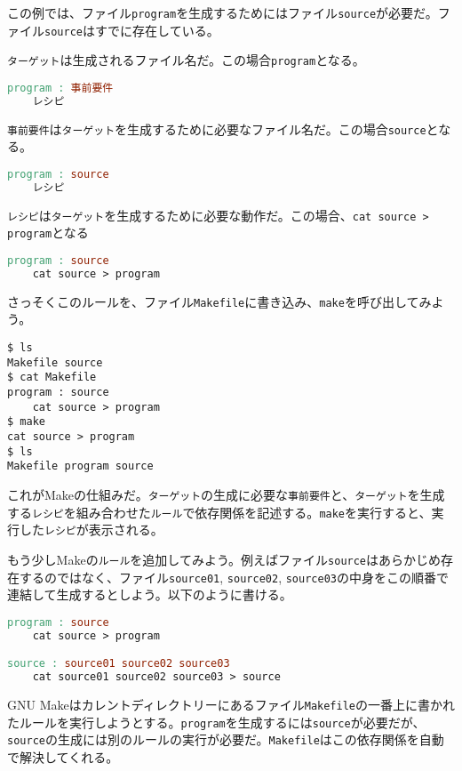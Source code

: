 この例では、ファイル\texttt{program}を生成するためにはファイル\texttt{source}が必要だ。ファイル\texttt{source}はすでに存在している。

\texttt{ターゲット}は生成されるファイル名だ。この場合\texttt{program}となる。

\begin{lstlisting}[language=make]
program : 事前要件
    レシピ
\end{lstlisting}

\texttt{事前要件}は\texttt{ターゲット}を生成するために必要なファイル名だ。この場合\texttt{source}となる。

\begin{lstlisting}[language=make]
program : source
    レシピ
\end{lstlisting}

\texttt{レシピ}は\texttt{ターゲット}を生成するために必要な動作だ。この場合、\texttt{cat source > program}となる

\ifTombow\pagebreak\fi
\begin{lstlisting}[language=make]
program : source
    cat source > program
\end{lstlisting}

さっそくこのルールを、ファイル\texttt{Makefile}に書き込み、\texttt{make}を呼び出してみよう。

\begin{lstlisting}[style=terminal]
$ ls
Makefile source 
$ cat Makefile
program : source
    cat source > program
$ make
cat source > program
$ ls
Makefile program source
\end{lstlisting}

これがMakeの仕組みだ。\texttt{ターゲット}の生成に必要な\texttt{事前要件}と、\texttt{ターゲット}を生成する\texttt{レシピ}を組み合わせた\texttt{ルール}で依存関係を記述する。\texttt{make}を実行すると、実行した\texttt{レシピ}が表示される。

もう少しMakeの\texttt{ルール}を追加してみよう。例えばファイル\texttt{source}はあらかじめ存在するのではなく、ファイル\texttt{source01}, \texttt{source02}, \texttt{source03}の中身をこの順番で連結して生成するとしよう。以下のように書ける。

\begin{lstlisting}[language=make]
program : source
    cat source > program

source : source01 source02 source03
    cat source01 source02 source03 > source
\end{lstlisting}

GNU Makeはカレントディレクトリーにあるファイル\texttt{Makefile}の一番上に書かれたルールを実行しようとする。\texttt{program}を生成するには\texttt{source}が必要だが、\texttt{source}の生成には別のルールの実行が必要だ。\texttt{Makefile}はこの依存関係を自動で解決してくれる。

